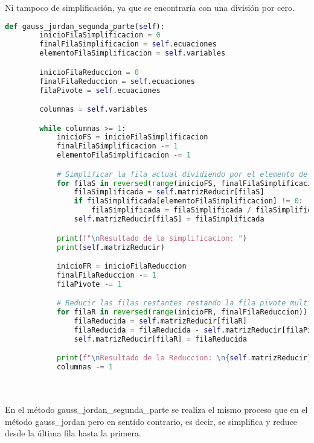\documentclass[letterpaper,12pt]{article}
\begin{document}
Ni tampoco de simplificación, ya que se encontraría con una división por cero.
\\\begin{lstlisting}[style=jupyter, language=Python, caption={Método para resolver el sistema de ecuaciones}]
    def gauss_jordan_segunda_parte(self):
        inicioFilaSimplificacion = 0
        finalFilaSimplificacion = self.ecuaciones
        elementoFilaSimplificacion = self.variables

        inicioFilaReduccion = 0
        finalFilaReduccion = self.ecuaciones
        filaPivote = self.ecuaciones

        columnas = self.variables

        while columnas >= 1:
            inicioFS = inicioFilaSimplificacion
            finalFilaSimplificacion -= 1
            elementoFilaSimplificacion -= 1

            # Simplificar la fila actual dividiendo por el elemento de la columna correspondiente
            for filaS in reversed(range(inicioFS, finalFilaSimplificacion + 1)):
                filaSimplificada = self.matrizReducir[filaS]
                if filaSimplificada[elementoFilaSimplificacion] != 0:
                    filaSimplificada = filaSimplificada / filaSimplificada[elementoFilaSimplificacion]
                self.matrizReducir[filaS] = filaSimplificada

            print(f"\nResultado de la simplificacion: ")
            print(self.matrizReducir)

            inicioFR = inicioFilaReduccion
            finalFilaReduccion -= 1
            filaPivote -= 1

            # Reducir las filas restantes restando la fila pivote multiplicada por el elemento correspondiente
            for filaR in reversed(range(inicioFR, finalFilaReduccion)):
                filaReducida = self.matrizReducir[filaR]
                filaReducida = filaReducida - self.matrizReducir[filaPivote]
                self.matrizReducir[filaR] = filaReducida

            print(f"\nResultado de la Reduccion: \n{self.matrizReducir}")
            columnas -= 1
\end{lstlisting}
\\\\
En el método \textcolor{jl_keyword}{gauss\_jordan\_segunda\_parte} se realiza el mismo proceso que en el método \textcolor{jl_keyword}{gauss\_jordan} pero en sentido contrario, es decir, se simplifica y reduce desde la última fila hasta la primera.
\end{document}
